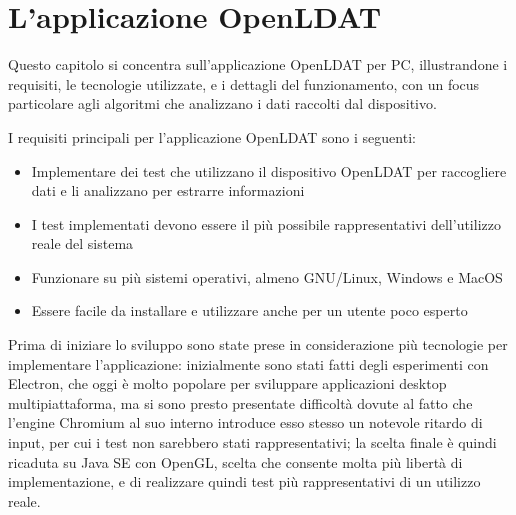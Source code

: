 \setlength{\parskip}{10pt}
\setlength{\parindent}{0pt}
\chapter{L'applicazione OpenLDAT}
\label{chap:app}

Questo capitolo si concentra sull'applicazione OpenLDAT per PC, illustrandone i requisiti, le tecnologie utilizzate, e i dettagli del funzionamento, con un focus particolare agli algoritmi che analizzano i dati raccolti dal dispositivo.

I requisiti principali per l'applicazione OpenLDAT sono i seguenti:
\begin{itemize}
	\item Implementare dei test che utilizzano il dispositivo OpenLDAT per raccogliere dati e li analizzano per estrarre informazioni
	\item I test implementati devono essere il più possibile rappresentativi dell'utilizzo reale del sistema
	\item Funzionare su più sistemi operativi, almeno GNU/Linux, Windows e MacOS
	\item Essere facile da installare e utilizzare anche per un utente poco esperto
\end{itemize}

Prima di iniziare lo sviluppo sono state prese in considerazione più tecnologie per implementare l'applicazione: inizialmente sono stati fatti degli esperimenti con Electron, che oggi è molto popolare per sviluppare applicazioni desktop multipiattaforma, ma si sono presto presentate difficoltà dovute al fatto che l'engine Chromium al suo interno introduce esso stesso un notevole ritardo di input, per cui i test non sarebbero stati rappresentativi; la scelta finale è quindi ricaduta su Java SE con OpenGL, scelta che consente molta più libertà di implementazione, e di realizzare quindi test più rappresentativi di un utilizzo reale.

